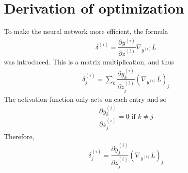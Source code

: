 \documentclass{article}
\begin{document}
 	\section{Derivation of optimization}
 	To make the neural network more efficient, the formula
 	\begin{gather*}
 		\delta^{(i)} = \dfrac{\partial y^{(i)}}{\partial z^{(i)}} \nabla_{y^{(i)}}L
 	\end{gather*}
 	was introduced. This is a matrix multiplication, and thus
 	\begin{gather*}
 		\delta^{(i)}_j = \sum_{k} \dfrac{\partial y^{(i)}_k}{\partial z^{(i)}_j} \left( \nabla_{y^{(i)}}L \right)_j
 	\end{gather*}
 	The activation function only acts on each entry and so
 	\begin{gather*}
 		 \dfrac{\partial y^{(i)}_k}{\partial z^{(i)}_j} = 0 \text{ if } k \neq j
 	\end{gather*}
 	Therefore,
 	\begin{gather*}
 		\delta^{(i)}_j = \dfrac{\partial y^{(i)}_j}{\partial z^{(i)}_j} \left( \nabla_{y^{(i)}}L \right)_j
 	\end{gather*}
\end{document}

